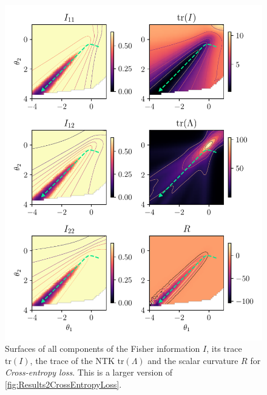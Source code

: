 \begin{figure}
	\centering
	\includegraphics{Experiment2/plots/CrossEntropyLoss_tracecomparison_Big.pdf}
	\caption{Surfaces of all components of the Fisher information $I$, its trace $\mathrm{tr}(I)$, the trace of the NTK $\mathrm{tr}(\Lambda)$ and the scalar curvature $R$ for \emph{Cross-entropy loss}. This is a larger version of \cref{fig:Results2CrossEntropyLoss}.}
	\label{fig:Results2CrossEntropyLossBig}
\end{figure}